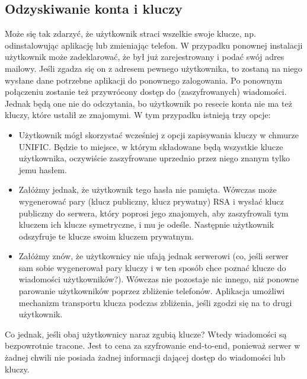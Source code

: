\documentclass{article}
\begin{document}
\subsection{Odzyskiwanie konta i kluczy}

Może się tak zdarzyć, że użytkownik straci wszelkie swoje klucze, np. odinstalowując aplikację lub zmieniając telefon. W przypadku
ponownej instalacji użytkownik może zadeklarować, że był już zarejestrowany i podać swój adres mailowy. Jeśli zgadza się on z adresem pewnego użytkownika, to zostaną na niego wysłane dane potrzebne aplikacji do ponownego zalogowania. Po ponownym
połączeniu zostanie też przywrócony dostęp do (zaszyfrowanych) wiadomości.\\

Jednak będą one nie do odczytania, bo użytkownik po resecie konta nie ma też kluczy, które ustalił ze znajomymi. W tym przypadku
istnieją trzy opcje:

\begin{itemize}
\item Użytkownik mógł skorzystać wcześniej z opcji zapisywania kluczy w chmurze UNIFIC. Będzie to miejsce, w którym składowane
będą wszystkie klucze użytkownika, oczywiście zaszyfrowane uprzednio przez niego znanym tylko jemu hasłem.

\item Załóżmy jednak, że użytkownik tego hasła nie pamięta. Wówczas może wygenerować pary (klucz publiczny, klucz prywatny) RSA
i wysłać klucz publiczny do serwera, który poprosi jego znajomych, aby zaszyfrowali tym kluczem ich klucze symetryczne,
i mu je odeśle. Następnie użytkownik odszyfruje te klucze swoim kluczem prywatnym.

\item Załóżmy znów, że użytkownicy nie ufają jednak serwerowi (co, jeśli serwer sam sobie wygenerował pary kluczy i w ten sposób
chce poznać klucze do wiadomości użytkowników?). Wówczas nie pozostaje nic innego, niż ponowne parowanie użytkowników poprzez
zbliżenie telefonów. Aplikacja umożliwi mechanizm transportu klucza podczas zbliżenia, jeśli zgodzi się na to drugi użytkownik.
\end{itemize}

Co jednak, jeśli obaj użytkownicy naraz zgubią klucze? Wtedy wiadomości są bezpowrotnie tracone. Jest to cena za szyfrowanie
end-to-end, ponieważ serwer w żadnej chwili nie posiada żadnej informacji dającej dostęp do wiadomości lub kluczy.
\end{document}
